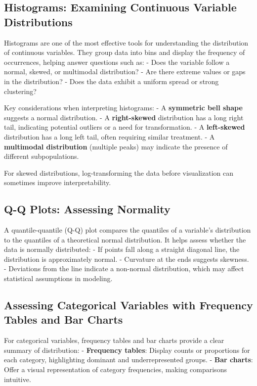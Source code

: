 \documentclass[12pt,openany, draft]{book}
\begin{document}
\subsection{Histograms: Examining Continuous Variable Distributions}

Histograms are one of the most effective tools for understanding the distribution of continuous variables. They group data into bins and display the frequency of occurrences, helping answer questions such as:
- Does the variable follow a normal, skewed, or multimodal distribution?
- Are there extreme values or gaps in the distribution?
- Does the data exhibit a uniform spread or strong clustering?

Key considerations when interpreting histograms:
- A \textbf{symmetric bell shape} suggests a normal distribution.
- A \textbf{right-skewed} distribution has a long right tail, indicating potential outliers or a need for transformation.
- A \textbf{left-skewed} distribution has a long left tail, often requiring similar treatment.
- A \textbf{multimodal distribution} (multiple peaks) may indicate the presence of different subpopulations.

For skewed distributions, log-transforming the data before visualization can sometimes improve interpretability.

\subsection{Q-Q Plots: Assessing Normality}

A quantile-quantile (Q-Q) plot compares the quantiles of a variable’s distribution to the quantiles of a theoretical normal distribution. It helps assess whether the data is normally distributed:
- If points fall along a straight diagonal line, the distribution is approximately normal.
- Curvature at the ends suggests skewness.
- Deviations from the line indicate a non-normal distribution, which may affect statistical assumptions in modeling.

\subsection{Assessing Categorical Variables with Frequency Tables and Bar Charts}

For categorical variables, frequency tables and bar charts provide a clear summary of distribution:
- \textbf{Frequency tables}: Display counts or proportions for each category, highlighting dominant and underrepresented groups.
- \textbf{Bar charts}: Offer a visual representation of category frequencies, making comparisons intuitive.
\end{document}

